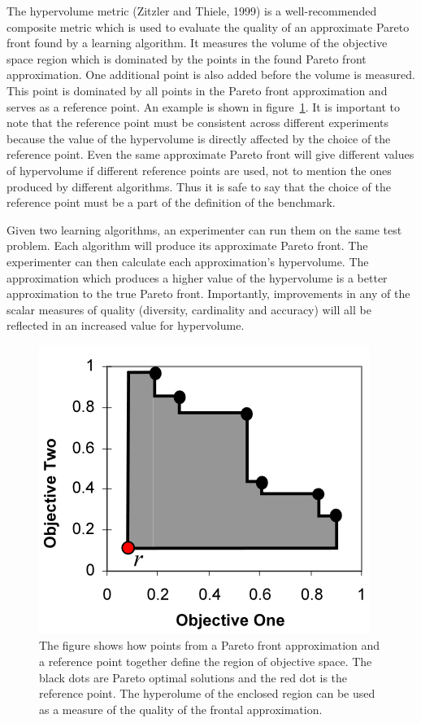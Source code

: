 The hypervolume metric (Zitzler and Thiele, 1999\nocite{zitzler1999pareto}) is a well-recommended composite metric which is used to evaluate the quality of an approximate Pareto front found by a learning algorithm. It measures the volume of the objective space region which is dominated by the points in the found Pareto front approximation. One additional point is also added before the volume is measured. This point is dominated by all points in the Pareto front approximation and serves as a reference point. An example is shown in figure~\ref{fig:hyperVolume}. It is important to note that the reference point must be consistent across different experiments because the value of the hypervolume is directly affected by the choice of the reference point. Even the same approximate Pareto front will give different values of hypervolume if different reference points are used, not to mention the ones produced by different algorithms. Thus it is safe to say that the choice of the reference point must be a part of the definition of the benchmark.

Given two learning algorithms, an experimenter can run them on the same test problem. Each algorithm will produce its approximate Pareto front. The experimenter can then calculate each approximation's hypervolume. The approximation which produces a higher value of the hypervolume is a better approximation to the true Pareto front. Importantly, improvements in any of the scalar measures of quality (diversity, cardinality and accuracy) will all be reflected in an increased value for hypervolume.

\begin{figure}[ht]
\centering
\includegraphics[scale=0.9]{hypervolume.png}
\caption{The figure shows how points from a Pareto front approximation and a reference point together define the region of objective space. The black dots are Pareto optimal solutions and the red dot is the reference point. The hyperolume of the enclosed region can be used as a measure of the quality of the frontal approximation.}
\label{fig:hyperVolume}
\end{figure}


